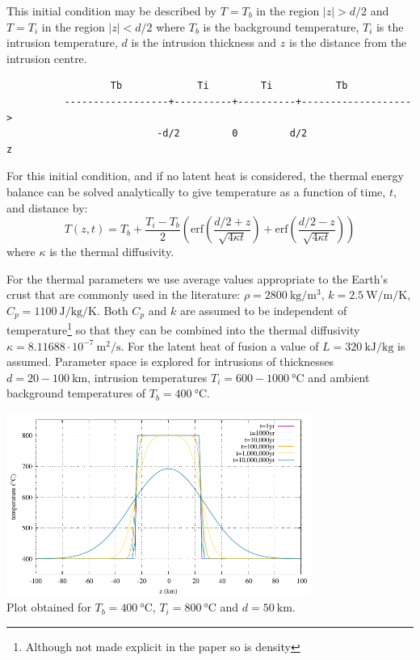 This initial condition may be described by $T=T_b$ in the region
$|z|>d/2$ and $T=T_i$ in the region $|z|<d/2$
where $T_b$ is the background temperature,
$T_i$ is the intrusion temperature, $d$ is the intrusion
thickness and $z$ is the distance from the intrusion centre. 
\begin{small}
\begin{verbatim}
                  Tb             Ti         Ti           Tb
          ------------------+----------+----------+-------------------> 
                          -d/2         0         d/2                  z
\end{verbatim}
\end{small}

For this initial condition, and if no latent
heat is considered, the thermal energy balance
can be solved analytically to give temperature as
a function of time, $t$, and distance by:
\[
T(z,t)=T_b + \frac{T_i-T_b}{2} 
\left(
\text{erf} \left( \frac{d/2 +z}{\sqrt{4\kappa t}} \right)
+
\text{erf} \left( \frac{d/2 -z}{\sqrt{4\kappa t}} \right)
\right)
\]
where $\kappa$ is the thermal diffusivity.


For the thermal parameters we use average
values appropriate to the Earth's crust that are
commonly used in the literature:
$\rho=2800~\si{\kg\per\cubic\meter}$, $k=2.5~\si{\watt\per\meter\per\kelvin}$, $C_p=1100~\si{\joule\per\kg\per\kelvin}$.
Both $C_p$ and $k$ are assumed to be independent of
temperature\footnote{Although not made explicit in the 
paper so is density} 
so that they can be combined into the thermal 
diffusivity $\kappa=8.11688\cdot10^{-7}~\si{\square\meter\per\second}$.
For the latent heat of fusion a value
of $L = 320~\si{\kilo\joule\per\kg}$ is assumed. Parameter space
is explored for intrusions of thicknesses $d = 20 - 100~\si{\km}$, 
intrusion temperatures $T_i = 600-1000~\si{\celsius}$
and ambient background temperatures of $T_b =400~\si{\celsius}$. 


\begin{center}
\includegraphics[width=10cm]{python_codes/fieldstone_169/images/solution.pdf}\\
{\captionfont Plot obtained for $T_b=400~\si{\celsius}$, $T_i=800~\si{\celsius}$ and $d=50~\si{\km}$.}
\end{center}


